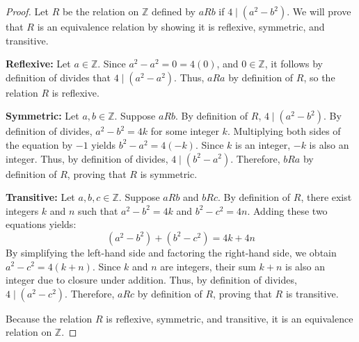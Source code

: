 \documentclass[12pt]{amsart}
\begin{document}
\begin{proof} 
Let $R$ be the relation on $\mathbb{Z}$ defined by $aRb$ if $4 \mid (a^2-b^2)$. We will prove that $R$ is an equivalence relation by showing it is reflexive, symmetric, and transitive. 

\medskip
\textbf{Reflexive:} Let $a \in \mathbb{Z}.$ Since $a^2 - a^2 = 0 = 4(0)$, and $0 \in \mathbb{Z}$, it follows by definition of divides that $4 \mid (a^2-a^2)$. Thus, $aRa$ by definition of $R$, so the relation $R$ is reflexive.

\medskip
\textbf{Symmetric:} Let $a,b \in \mathbb{Z}$. Suppose $aRb$. By definition of $R$, $4 \mid (a^2-b^2)$. By definition of divides, $a^2-b^2=4k$ for some integer $k$. Multiplying both sides of the equation by $-1$ yields $b^2-a^2 = 4(-k)$. Since $k$ is an integer, $-k$ is also an integer. Thus, by definition of divides, $4 \mid (b^2 - a^2)$. Therefore, $bRa$ by definition of $R$, proving that $R$ is symmetric.

\medskip
\textbf{Transitive:} Let $a,b,c \in \mathbb{Z}$. Suppose $aRb$ and $bRc$. By definition of $R$, there exist integers $k$ and $n$ such that $a^2-b^2=4k$ and $b^2-c^2=4n$. Adding these two equations yields:
\[
    (a^2-b^2) + (b^2-c^2) = 4k + 4n
\]
By simplifying the left-hand side and factoring the right-hand side, we obtain $a^2 - c^2 = 4(k+n)$. Since $k$ and $n$ are integers, their sum $k+n$ is also an integer due to closure under addition. Thus, by definition of divides, $4 \mid (a^2-c^2)$. Therefore, $aRc$ by definition of $R$, proving that $R$ is transitive.

Because the relation $R$ is reflexive, symmetric, and transitive, it is an equivalence relation on $\mathbb{Z}$.
\end{proof}

\newpage
\end{document}
